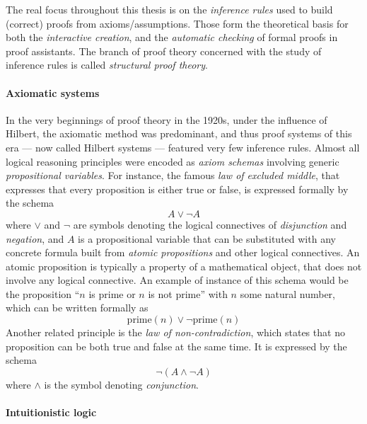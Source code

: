 \begin{emphpar}
The real focus throughout this thesis is on the \emph{inference rules} used to
build (correct) proofs from axioms/assumptions. Those form the theoretical basis
for both the \emph{interactive creation}, and the \emph{automatic checking} of
formal proofs in proof assistants. The branch of proof theory concerned with the
study of inference rules is called \emph{structural proof theory}.
\end{emphpar}

\paragraph{Axiomatic systems} 

In the very beginnings of proof theory in the 1920s, under the influence of
Hilbert, the axiomatic method was predominant, and thus proof systems of this
era --- now called Hilbert systems --- featured very few inference rules. Almost
all logical reasoning principles were encoded as \emph{axiom schemas} involving
generic \emph{propositional variables}. For instance, the famous \emph{law of
excluded middle}, that expresses that every proposition is either true or false,
is expressed formally by the schema
$$A \lor \neg A$$
where $\lor$ and $\neg$ are symbols denoting the logical connectives of
\emph{disjunction} and \emph{negation}, and $A$ is a propositional variable that
can be substituted with any concrete formula built from \emph{atomic
propositions} and other logical connectives. An atomic proposition is typically
a property of a mathematical object, that does not involve any logical
connective. An example of instance of this schema would be the proposition ``$n$
is prime or $n$ is not prime'' with $n$ some natural number, which can be
written formally as
$$\mathrm{prime}(n) \lor \neg\mathrm{prime}(n)$$
Another related principle is the \emph{law of non-contradiction}, which states
that no proposition can be both true and false at the same time. It is expressed
by the schema
$$\neg (A \land \neg A)$$
where $\land$ is the symbol denoting \emph{conjunction}.

\paragraph{Intuitionistic logic}

